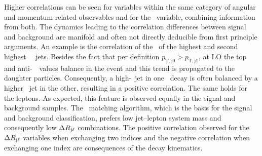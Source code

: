 %
Higher correlations can be seen for variables within the same category of angular and momentum related observables and for the \ptlb\ variable, combining information from both. 
%
The dynamics leading to the correlation differences between signal and background are manifold and often not directly deducible from first principle arguments. 
%
An example is the correlation of the \pt\ of the highest and second highest \pt\ \btagged\ jets. Besides the fact that per definition $p_\mathrm{T,j0} > p_\mathrm{T,j1}$, at \gls{LO} the top and anti-\tquark\ \pt\ values balance in the event and this trend is propagated to the daughter particles. Consequently, a high-\pt\ jet in one \tquark\ decay is often balanced by a higher \pt\ jet in the other, resulting in a positive correlation. The same holds for the leptons. As expected, this feature is observed equally in the signal and background samples.
%
The \mlb\ matching algorithm, which is the basis for the signal and background classification, prefers low jet--lepton system mass and consequently low $\Delta R_\mathrm{j\ell}$ combinations. 
%
The positive correlation observed for the $\Delta R_\mathrm{j\ell}$ variables when exchanging two indices and the negative correlation when exchanging one index are consequences of the decay kinematics. 
%




